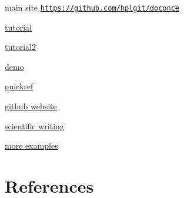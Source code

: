 \documentclass[%
twocolumn,
twoside,                 %
final,                   %
10pt]{article}
\begin{document}
main site \href{{https://github.com/hplgit/doconce}}{\nolinkurl{https://github.com/hplgit/doconce}}

\href{{http://hplgit.github.io/doconce/doc/pub/tutorial/tutorial.html}}{tutorial}  

\href{{http://hplgit.github.io/doconce/doc/pub/tutorial/html/tutorial.html}}{tutorial2}  

\href{{http://hplgit.github.io/teamods/writing_reports/index.html}}{demo}  

\href{{http://hplgit.github.io/doconce/doc/pub/quickref/quickref.html}}{quickref}  

\href{{http://hplgit.github.io/doconce/doc/web/index.html}}{github website}  

\href{{http://hplgit.github.io/doconce/doc/pub/slides/scientific_writing-1.html}}{scientific writing}  

\href{{https://github.com/hplgit/hplgit.github.com/tree/master/teamods}}{more examples}  

\section{References}
\label{sec:ref}











\printindex
\end{document}
